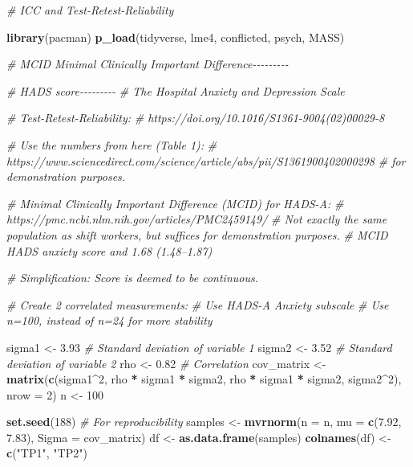 \documentclass[
]{article}
\newenvironment{Shaded}{\begin{snugshade}}{\end{snugshade}}
\newcommand{\AttributeTok}[1]{\textcolor[rgb]{0.13,0.29,0.53}{#1}}
\newcommand{\CommentTok}[1]{\textcolor[rgb]{0.56,0.35,0.01}{\textit{#1}}}
\newcommand{\DecValTok}[1]{\textcolor[rgb]{0.00,0.00,0.81}{#1}}
\newcommand{\FloatTok}[1]{\textcolor[rgb]{0.00,0.00,0.81}{#1}}
\newcommand{\FunctionTok}[1]{\textcolor[rgb]{0.13,0.29,0.53}{\textbf{#1}}}
\newcommand{\NormalTok}[1]{#1}
\newcommand{\OtherTok}[1]{\textcolor[rgb]{0.56,0.35,0.01}{#1}}
\newcommand{\SpecialCharTok}[1]{\textcolor[rgb]{0.81,0.36,0.00}{\textbf{#1}}}
\newcommand{\StringTok}[1]{\textcolor[rgb]{0.31,0.60,0.02}{#1}}
\begin{document}
\begin{Shaded}
\begin{Highlighting}[]
\CommentTok{\# ICC and Test{-}Retest{-}Reliability}

\FunctionTok{library}\NormalTok{(pacman)}
\FunctionTok{p\_load}\NormalTok{(tidyverse, lme4, conflicted, psych, MASS)}

\CommentTok{\# MCID Minimal Clinically Important Difference{-}{-}{-}{-}{-}{-}{-}{-}{-}}

\CommentTok{\# HADS score{-}{-}{-}{-}{-}{-}{-}{-}{-}}
\CommentTok{\# The Hospital Anxiety and Depression Scale }

\CommentTok{\# Test{-}Retest{-}Reliability:}
\CommentTok{\# https://doi.org/10.1016/S1361{-}9004(02)00029{-}8}

\CommentTok{\# Use the numbers from here (Table 1):}
\CommentTok{\# https://www.sciencedirect.com/science/article/abs/pii/S1361900402000298}
\CommentTok{\# for demonstration purposes.}

\CommentTok{\# Minimal Clinically Important Difference (MCID) for HADS{-}A:}
\CommentTok{\# https://pmc.ncbi.nlm.nih.gov/articles/PMC2459149/}
\CommentTok{\# Not exactly the same population as shift workers, but suffices for demonstration purposes.}
\CommentTok{\# MCID HADS anxiety score and 1.68 (1.48–1.87)}

\CommentTok{\# Simplification: Score is deemed to be continuous.}

\CommentTok{\# Create 2 correlated measurements:}
\CommentTok{\# Use HADS{-}A Anxiety subscale}
\CommentTok{\# Use n=100, instead of n=24 for more stability}

\NormalTok{sigma1 }\OtherTok{\textless{}{-}} \FloatTok{3.93}  \CommentTok{\# Standard deviation of variable 1}
\NormalTok{sigma2 }\OtherTok{\textless{}{-}} \FloatTok{3.52}  \CommentTok{\# Standard deviation of variable 2}
\NormalTok{rho }\OtherTok{\textless{}{-}} \FloatTok{0.82}    \CommentTok{\# Correlation}
\NormalTok{cov\_matrix }\OtherTok{\textless{}{-}} \FunctionTok{matrix}\NormalTok{(}\FunctionTok{c}\NormalTok{(sigma1}\SpecialCharTok{\^{}}\DecValTok{2}\NormalTok{, rho }\SpecialCharTok{*}\NormalTok{ sigma1 }\SpecialCharTok{*}\NormalTok{ sigma2,}
\NormalTok{                       rho }\SpecialCharTok{*}\NormalTok{ sigma1 }\SpecialCharTok{*}\NormalTok{ sigma2, sigma2}\SpecialCharTok{\^{}}\DecValTok{2}\NormalTok{), }\AttributeTok{nrow =} \DecValTok{2}\NormalTok{)}
\NormalTok{n }\OtherTok{\textless{}{-}} \DecValTok{100}

\FunctionTok{set.seed}\NormalTok{(}\DecValTok{188}\NormalTok{)  }\CommentTok{\# For reproducibility}
\NormalTok{samples }\OtherTok{\textless{}{-}} \FunctionTok{mvrnorm}\NormalTok{(}\AttributeTok{n =}\NormalTok{ n, }\AttributeTok{mu =} \FunctionTok{c}\NormalTok{(}\FloatTok{7.92}\NormalTok{, }\FloatTok{7.83}\NormalTok{), }\AttributeTok{Sigma =}\NormalTok{ cov\_matrix)}
\NormalTok{df }\OtherTok{\textless{}{-}} \FunctionTok{as.data.frame}\NormalTok{(samples)}
\FunctionTok{colnames}\NormalTok{(df) }\OtherTok{\textless{}{-}} \FunctionTok{c}\NormalTok{(}\StringTok{"TP1"}\NormalTok{, }\StringTok{"TP2"}\NormalTok{)}


\end{Highlighting}
\end{Shaded}
\end{document}

